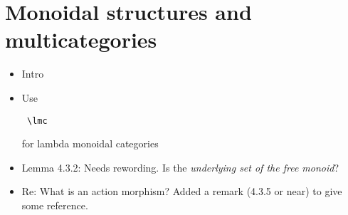 \documentclass{amsart}
\begin{document}
\section{ Monoidal structures and multicategories}

\begin{itemize}
\item Intro
\item Use \begin{verbatim} \lmc \end{verbatim} for lambda monoidal categories
\item Lemma 4.3.2: Needs rewording. Is the \textit{underlying set of the free monoid}?
\item Re: What is an action morphism? Added a remark (4.3.5 or near) to give some reference.

\end{itemize}
\end{document}
